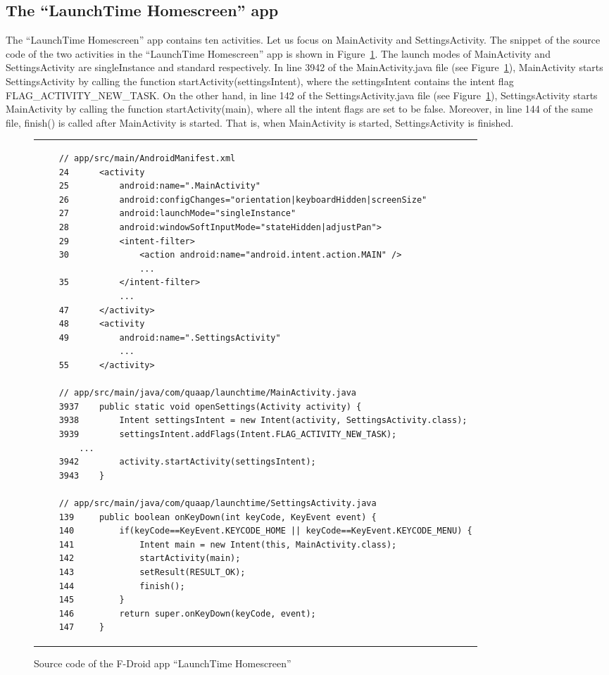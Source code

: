 \subsection{The ``LaunchTime Homescreen'' app}
The ``LaunchTime Homescreen'' app contains ten activities. Let us focus on MainActivity and SettingsActivity. The snippet of the source code of the two activities in the ``LaunchTime Homescreen'' app is shown in Figure~\ref{code-launchtime}. The launch modes of MainActivity and SettingsActivity are singleInstance and standard respectively. 
In line 3942 of the MainActivity.java file (see Figure~\ref{code-launchtime}), MainActivity starts SettingsActivity by calling the function startActivity(settingsIntent), where the settingsIntent contains the intent flag FLAG\_ACTIVITY\_NEW\_TASK. 
On the other hand, in line 142 of the SettingsActivity.java file (see Figure~\ref{code-launchtime}), SettingsActivity starts MainActivity by calling the function startActivity(main), where all the intent flags are set to be false. Moreover, in line 144 of the same file, finish() is called after MainActivity is started. That is, when MainActivity is started, SettingsActivity is finished. 

\begin{figure}[htbp]
    \centering
    \begin{tabular*}{\linewidth}{l}
    \begin{lstlisting}
    // app/src/main/AndroidManifest.xml
    24      <activity
    25          android:name=".MainActivity"
    26          android:configChanges="orientation|keyboardHidden|screenSize"
    27          android:launchMode="singleInstance"
    28          android:windowSoftInputMode="stateHidden|adjustPan">
    29          <intent-filter>
    30              <action android:name="android.intent.action.MAIN" />
                    ...
    35          </intent-filter>
                ...
    47      </activity>
    48      <activity
    49          android:name=".SettingsActivity"
                ...
    55      </activity>

    // app/src/main/java/com/quaap/launchtime/MainActivity.java
    3937    public static void openSettings(Activity activity) {
    3938        Intent settingsIntent = new Intent(activity, SettingsActivity.class);
    3939        settingsIntent.addFlags(Intent.FLAG_ACTIVITY_NEW_TASK);
		...
    3942        activity.startActivity(settingsIntent);
    3943    }

    // app/src/main/java/com/quaap/launchtime/SettingsActivity.java
    139     public boolean onKeyDown(int keyCode, KeyEvent event) {
    140         if(keyCode==KeyEvent.KEYCODE_HOME || keyCode==KeyEvent.KEYCODE_MENU) {
    141             Intent main = new Intent(this, MainActivity.class);
    142             startActivity(main);
    143             setResult(RESULT_OK);
    144             finish();
    145         }
    146         return super.onKeyDown(keyCode, event);
    147     }
    \end{lstlisting}
    \end{tabular*}
    \caption{Source code of the F-Droid app ``LaunchTime Homescreen''}
    \label{code-launchtime}
    \end{figure}

